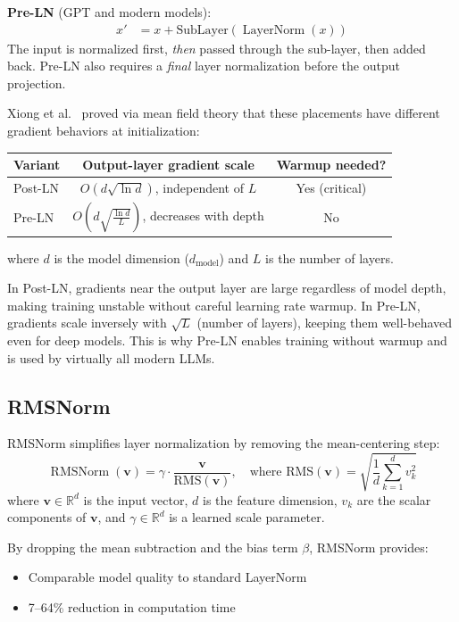 \documentclass[11pt,a4paper]{article}
\newcommand{\R}{\mathbb{R}}
\newcommand{\LayerNorm}{\operatorname{LayerNorm}}
\newcommand{\RMSNorm}{\operatorname{RMSNorm}}
\newcommand{\dmodel}{d_{\text{model}}}
\begin{document}
\textbf{Pre-LN} (GPT and modern models):
\begin{align}
  x' &= x + \text{SubLayer}(\LayerNorm(x))
\end{align}
The input is normalized first, \emph{then} passed through the sub-layer, then added back.
Pre-LN also requires a \emph{final} layer normalization before the output projection.

Xiong et al.\ \cite{xiong2020} proved via mean field theory that these placements have
different gradient behaviors at initialization:

\begin{center}
\begin{tabular}{lcc}
\toprule
\textbf{Variant} & \textbf{Output-layer gradient scale} & \textbf{Warmup needed?} \\
\midrule
Post-LN & $O(d\sqrt{\ln d})$, independent of $L$ & Yes (critical) \\
Pre-LN  & $O\!\left(d\sqrt{\frac{\ln d}{L}}\right)$, decreases with depth & No \\
\bottomrule
\end{tabular}
\end{center}

\noindent where $d$ is the model dimension ($\dmodel$) and $L$ is the number of layers.

In Post-LN, gradients near the output layer are large regardless of model depth,
making training unstable without careful learning rate warmup. In Pre-LN, gradients
scale inversely with $\sqrt{L}$ (number of layers), keeping them well-behaved even for
deep models. This is why Pre-LN enables training without warmup and is used by virtually
all modern LLMs.

\subsection{RMSNorm}
\label{sec:rmsnorm}

RMSNorm \cite{zhang2019} simplifies layer normalization by removing the mean-centering
step:
\begin{equation}
  \RMSNorm(\bm{v}) = \gamma \cdot \frac{\bm{v}}{\text{RMS}(\bm{v})},
  \quad \text{where } \text{RMS}(\bm{v}) = \sqrt{\frac{1}{d}\sum_{k=1}^{d} v_k^2}
\end{equation}
where $\bm{v} \in \R^d$ is the input vector, $d$ is the feature dimension,
$v_k$ are the scalar components of $\bm{v}$, and $\gamma \in \R^d$ is a learned
scale parameter.

By dropping the mean subtraction and the bias term $\beta$, RMSNorm provides:
\begin{itemize}[nosep]
  \item Comparable model quality to standard LayerNorm
  \item 7--64\% reduction in computation time \cite{zhang2019}
\end{itemize}
\end{document}
